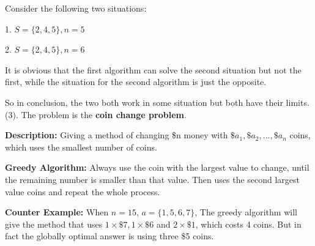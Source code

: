 \documentclass{article}
\begin{document}
Consider the following two situations:

1. $S=\{2,4,5\},n=5$

2. $S=\{2,4,5\},n=6$

It is obvious that the first algorithm can solve the second situation but not the first, while the situation for the second algorithm is just the opposite.

So in conclusion, the two both work in some situation but both have their limits.\\

{\noindent (3). The problem is the {\bf coin change problem}. }

{\bf Description: } Giving a method of changing \$n money with $\$a_1,\$a_2,...,\$a_n$ coins, which uses the smallest number of coins.  

{\bf Greedy Algorithm: }Always use the coin with the largest value to change, until the remaining number is smaller than that value. Then uses the second largest value coins and repeat the whole process.

{\bf Counter Example: } When $n=15$, $a=\{1,5,6,7\}$, The greedy algorithm will give the method that uses $1\times \$7,1\times \$6$ and $2\times \$1$, which costs 4 coins. But in fact the globally optimal answer is using three \$5 coins.
\end{document}
